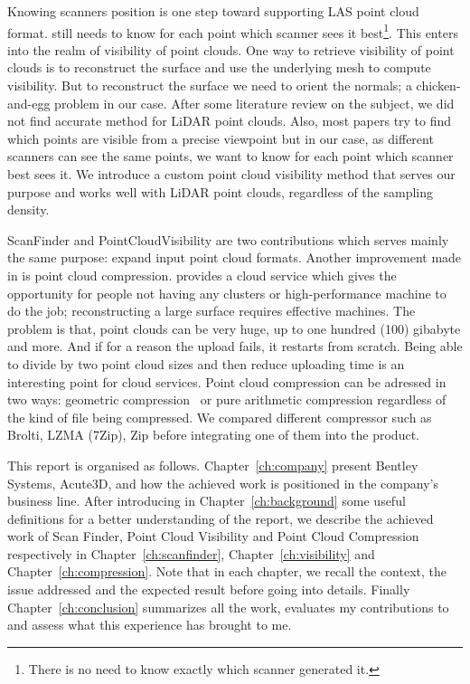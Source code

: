 Knowing scanners position is one step toward supporting LAS point cloud format. \CC still needs to know for each point which scanner sees it best\footnote{There is no need to know exactly which scanner generated it.}. This enters into the realm of visibility of point clouds. One way to retrieve visibility of point clouds is to reconstruct the surface and use the underlying mesh to compute visibility. But to reconstruct the surface we need to orient the normals; a chicken-and-egg problem in our case. After some literature review on the subject, we did not find accurate method for LiDAR point clouds. Also, most papers try to find which points are visible from a precise viewpoint but in our case, as different scanners can see the same points, we want to know for each point which scanner best sees it. We introduce a custom point cloud visibility method that serves our purpose and works well with LiDAR point clouds, regardless of the sampling density.

ScanFinder and PointCloudVisibility are two contributions which serves mainly the same purpose: expand \CC input point cloud formats. Another improvement made in \CC is point cloud compression. \CC provides a cloud service which gives the opportunity for people not having any clusters or high-performance machine to do the job; reconstructing a large surface requires effective machines. The problem is that, point clouds can be very huge, up to one hundred (100) gibabyte and more. And if for a reason the upload fails, it restarts from scratch. Being able to divide by two point cloud sizes and then reduce uploading time is an interesting point for \CC cloud services. Point cloud compression can be adressed in two ways: geometric compression~\cite{compress1, compress2} or pure arithmetic compression regardless of the kind of file being compressed. We compared different compressor such as Brolti, LZMA (7Zip), Zip before integrating one of them into the product.

This report is organised as follows. Chapter~\ref{ch:company} present Bentley Systems, Acute3D, \CC and how the achieved work is positioned in the company's business line. After introducing in Chapter~\ref{ch:background} some useful definitions for a better understanding of the report, we describe the achieved work of Scan Finder, Point Cloud Visibility and Point Cloud Compression respectively in Chapter~\ref{ch:scanfinder}, Chapter~\ref{ch:visibility} and
Chapter~\ref{ch:compression}. Note that in each chapter, we recall the context, the issue addressed and the expected result before going into details. Finally Chapter~\ref{ch:conclusion} summarizes all the work, evaluates my contributions to \CC and assess what this experience has brought to me.
